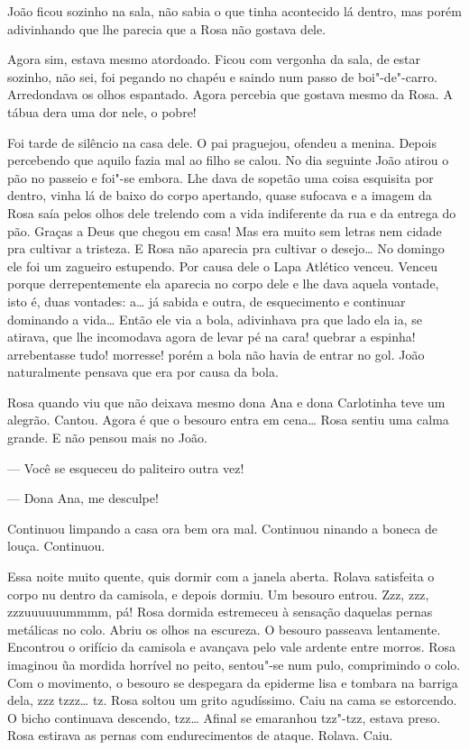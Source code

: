 João ficou sozinho na sala, não sabia o que tinha acontecido lá dentro,
mas porém adivinhando que lhe parecia que a Rosa não gostava dele.

Agora sim, estava mesmo atordoado. Ficou com vergonha da sala, de estar
sozinho, não sei, foi pegando no chapéu e saindo num passo de
boi"-de"-carro. Arredondava os olhos espantado. Agora percebia que gostava
mesmo da Rosa. A tábua dera uma dor nele, o pobre!

Foi tarde de silêncio na casa dele. O pai praguejou, ofendeu a menina.
Depois percebendo que aquilo fazia mal ao filho se calou. No dia
seguinte João atirou o pão no passeio e foi"-se embora. Lhe dava de
sopetão uma coisa esquisita por dentro, vinha lá de baixo do corpo
apertando, quase sufocava e a imagem da Rosa saía pelos olhos dele
trelendo com a vida indiferente da rua e da entrega do pão. Graças a
Deus que chegou em casa! Mas era muito sem letras nem cidade pra
cultivar a tristeza. E Rosa não aparecia pra cultivar o desejo\ldots{} No
domingo ele foi um zagueiro estupendo. Por causa dele o Lapa Atlético
venceu. Venceu porque derrepentemente ela aparecia no corpo dele e lhe
dava aquela vontade, isto é, duas vontades: a\ldots{} já sabida e outra, de
esquecimento e continuar dominando a vida\ldots{} Então ele via a bola,
adivinhava pra que lado ela ia, se atirava, que lhe incomodava agora de
levar pé na cara! quebrar a espinha! arrebentasse tudo! morresse! porém
a bola não havia de entrar no gol. João naturalmente pensava que era por
causa da bola.

Rosa quando viu que não deixava mesmo dona Ana e dona Carlotinha teve um
alegrão. Cantou. Agora é que o besouro entra em cena\ldots{} Rosa sentiu uma
calma grande. E não pensou mais no João. 

--- Você se esqueceu do paliteiro outra vez!

--- Dona Ana, me desculpe!

Continuou limpando a casa ora bem ora mal. Continuou ninando a boneca de
louça. Continuou.

Essa noite muito quente, quis dormir com a janela aberta. Rolava
satisfeita o corpo nu dentro da camisola, e depois dormiu. Um besouro
entrou. Zzz, zzz, zzzuuuuuummmm, pá! Rosa dormida estremeceu à sensação
daquelas pernas metálicas no colo. Abriu os olhos na escureza. O besouro
passeava lentamente. Encontrou o orifício da camisola e avançava pelo
vale ardente entre morros. Rosa imaginou ũa mordida horrível no peito,
sentou"-se num pulo, comprimindo o colo. Com o movimento, o besouro se
despegara da epiderme lisa e tombara na barriga dela, zzz tzzz\ldots{} tz.
Rosa soltou um grito agudíssimo. Caiu na cama se estorcendo. O bicho
continuava descendo, tzz\ldots{} Afinal se emaranhou tzz"-tzz, estava preso.
Rosa estirava as pernas com endurecimentos de ataque. Rolava. Caiu.

